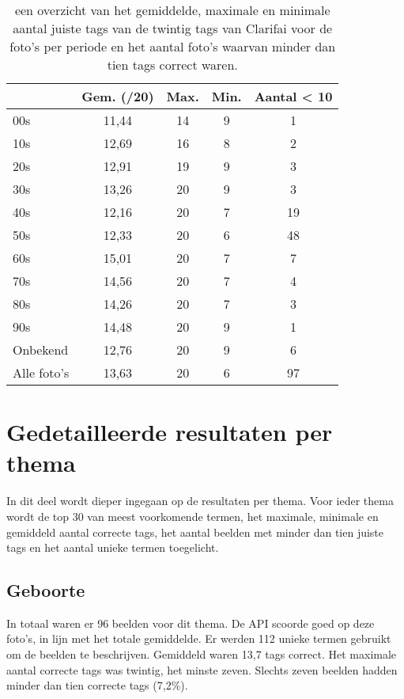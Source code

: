 \begin{table}
	\centering
	\begin{tabular}{l|cccc}
		\toprule
		& Gem. (/20) & Max. & Min. &  Aantal  < 10 \\ 
		\midrule
		00s & 11,44 & 14 & 9 & 1 \\ 
		10s & 12,69 & 16 & 8 &  2 \\ 
		20s & 12,91 & 19 & 9 & 3 \\ 
		30s & 13,26 & 20 & 9  & 3 \\ 
		40s & 12,16 & 20 & 7  & 19 \\ 
		50s & 12,33 & 20 & 6  & 48 \\ 
		60s & 15,01 & 20 & 7  & 7 \\ 
		70s & 14,56 & 20 & 7  & 4 \\ 
		80s & 14,26 & 20 & 7  & 3 \\ 
		90s & 14,48 & 20 & 9  & 1 \\ 
		Onbekend & 12,76 & 20 & 9  & 6 \\ 
		Alle foto's & 13,63 & 20 & 6  & 97 \\ 
		\bottomrule
	\end{tabular} 
	\caption[een overzicht van de resultaten per periode na gebruikt van het ingebouwde model van Clarifai]{een overzicht van het gemiddelde, maximale en minimale aantal juiste tags van de twintig tags van Clarifai voor de foto’s per periode en het aantal foto’s waarvan minder dan tien tags correct waren. }
	\label{tab:analyse-resultaten-periode}
\end{table}

\section{Gedetailleerde resultaten per thema}
\label{sec:gedetailleerde-resultaten-per-thema}

In dit deel wordt dieper ingegaan op de resultaten per thema. Voor ieder thema wordt de top 30 van meest voorkomende termen, het maximale, minimale en gemiddeld aantal correcte tags, het aantal beelden met minder dan tien juiste tags en het aantal unieke termen toegelicht. 

\subsection{Geboorte}

In totaal waren er 96 beelden voor dit thema. De API scoorde goed op deze foto’s, in lijn met het totale gemiddelde. Er werden 112 unieke termen gebruikt om de beelden te beschrijven. Gemiddeld waren 13,7 tags correct. Het maximale aantal correcte tags was twintig, het minste zeven. Slechts zeven beelden hadden minder dan tien correcte tags (7,2\%).

